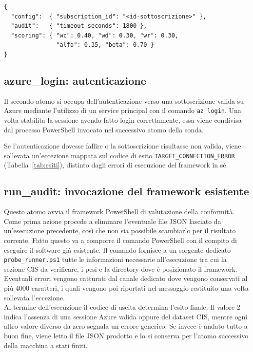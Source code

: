 \documentclass[a4paper,11pt]{report}
\begin{document}
\begin{lstlisting}[style=azcli, caption={Esempio di input della sonda.}, label={lst:input-example}]
{
  "config":  { "subscription_id": "<id-sottoscrizione>" },
  "audit":   { "timeout_seconds": 1800 },
  "scoring": { "wc": 0.40, "wd": 0.30, "wr": 0.30,
               "alfa": 0.35, "beta": 0.70 }
}
\end{lstlisting}








\subsection{azure\_login: autenticazione}

Il secondo atomo si occupa dell'autenticazione verso una sottoscrizione valida su Azure mediante l'utilizzo di un service principal con il comando \texttt{az login}. Una volta stabilita la sessione avendo fatto login correttamente, essa viene condivisa dal processo PowerShell invocato nel successivo atomo della sonda. 

Se l'autenticazione dovesse fallire o la sottoscrizione risultasse non valida, viene sollevata un'eccezione mappata sul codice di esito \texttt{TARGET\_CONNECTION\_ERROR} (Tabella~\ref{tab:esiti}), distinto dagli errori di esecuzione del framework in sè.


\subsection{run\_audit: invocazione del framework esistente}

Questo atomo avvia il framework PowerShell di valutazione della conformità. Come prima azione procede a eliminare l'eventuale file JSON lasciato da un'esecuzione precedente, così che non sia possibile scambiarlo per il risultato corrente. Fatto questo va a comporre il comando PowerShell con il compito di eseguire il software già esistente. Il comando fornisce a un sorgente dedicato \texttt{probe\_runner.ps1} tutte le informazioni necessarie all'esecuzione tra cui la sezione CIS da verificare, i pesi e la directory dove è posizionato il framework.\\
Eventuali errori vengono catturati dal canale dedicato dove vengono conservati al più 4000 caratteri, i quali vengono poi riportati nel messaggio restituito una volta sollevata l'eccezione. \\
Al termine dell'esecuzione il codice di uscita determina l'esito finale. Il valore 2 indica l'assenza di una sessione Azure valida oppure del dataset CIS, mentre ogni altro valore diverso da zero segnala un errore generico. 
Se invece è andato tutto a buon fine, viene letto il file JSON prodotto e lo si conserva per l'atomo successivo della macchina a stati finiti.
\end{document}
